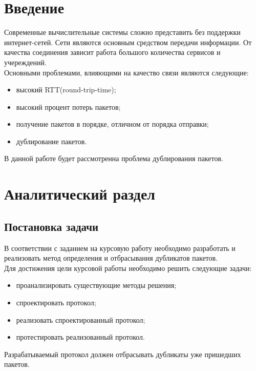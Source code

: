 \documentclass[14pt, a4paper]{extarticle}
\begin{document}
\setcounter{page}{3}

\clearpage
\tableofcontents

\clearpage
\section*{Введение}
	Современные вычислительные системы сложно представить без поддержки интернет-сетей. Сети являются основным средством передачи информации. От качества соединения зависит работа большого количества сервисов и учереждений.\\
\indent Основными проблемами, влияющими на качество связи являются следующие:
\begin{itemize}
	\item высокий RTT(round-trip-time);
	\item высокий процент потерь пакетов;
	\item получение пакетов в порядке, отличном от порядка отправки;
	\item дублирование пакетов.
\end{itemize}
\indent В данной работе будет рассмотренна проблема дублирования пакетов.

\clearpage
\section{Аналитический раздел}
\subsection{Постановка задачи}
В соответствии с заданием на курсовую работу необходимо разработать и реализовать метод определения и отбрасывания дубликатов пакетов. \\
\indent Для достижения цели курсовой работы необходимо решить следующие задачи:
\begin{itemize}
	\item проанализировать существующие методы решения;
	\item спроектировать протокол;
	\item реализовать спроектированный протокол;
	\item протестировать реализованный протокол.
\end{itemize}
\indent Разрабатываемый протокол должен отбрасывать дубликаты уже пришедших пакетов.
\end{document}
